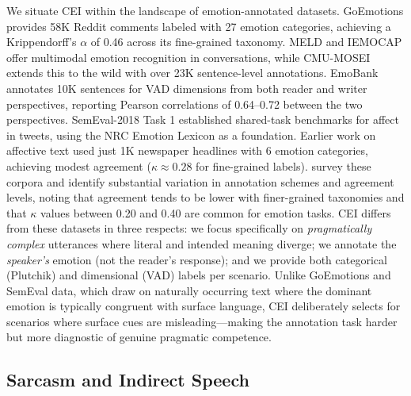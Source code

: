 \documentclass[twoside,11pt]{article}
\begin{document}
We situate CEI within the landscape of emotion-annotated datasets. GoEmotions \citep{demszky2020goemotions} provides 58K Reddit comments labeled with 27 emotion categories, achieving a Krippendorff's $\alpha$ of 0.46 across its fine-grained taxonomy. MELD \citep{poria2019meld} and IEMOCAP \citep{busso2008iemocap} offer multimodal emotion recognition in conversations, while CMU-MOSEI \citep{zadeh2018multimodal} extends this to the wild with over 23K sentence-level annotations. EmoBank \citep{buechel2017emobank} annotates 10K sentences for VAD dimensions from both reader and writer perspectives, reporting Pearson correlations of 0.64--0.72 between the two perspectives. SemEval-2018 Task 1 \citep{mohammad2018semeval} established shared-task benchmarks for affect in tweets, using the NRC Emotion Lexicon \citep{mohammad2012semeval} as a foundation. Earlier work on affective text \citep{strapparava2007semeval} used just 1K newspaper headlines with 6 emotion categories, achieving modest agreement ($\kappa \approx 0.28$ for fine-grained labels). \citet{bostan2018analysis} survey these corpora and identify substantial variation in annotation schemes and agreement levels, noting that agreement tends to be lower with finer-grained taxonomies and that $\kappa$ values between 0.20 and 0.40 are common for emotion tasks. CEI differs from these datasets in three respects: we focus specifically on \textit{pragmatically complex} utterances where literal and intended meaning diverge; we annotate the \textit{speaker's} emotion (not the reader's response); and we provide both categorical (Plutchik) and dimensional (VAD) labels per scenario. Unlike GoEmotions and SemEval data, which draw on naturally occurring text where the dominant emotion is typically congruent with surface language, CEI deliberately selects for scenarios where surface cues are misleading---making the annotation task harder but more diagnostic of genuine pragmatic competence.

\subsection{Sarcasm and Indirect Speech}
\end{document}

